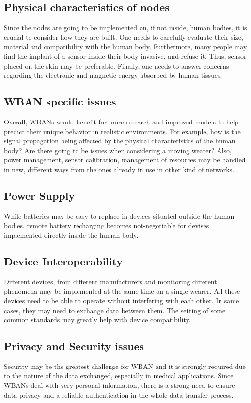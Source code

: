 \documentclass[conference]{IEEEtran}
\begin{document}
\subsection {Physical characteristics of nodes}
Since the nodes are going to be implemented on, if not inside, human bodies, it is crucial to consider how they are built. One needs to carefully evaluate their size, material and compatibility with the human body. Furthermore, many people may find the implant of a sensor inside their body invasive, and refuse it. Thus, sensor placed on the skin may be preferable. Finally, one needs to answer concerns regarding the electronic and magnetic energy absorbed by human tissues.

\subsection {WBAN specific issues}
Overall, WBANs would benefit for more research and improved models to help predict their unique behavior in realistic environments. For example, how is the signal propagation being affected by the physical characteristics of the human body? Are there going to be issues when considering a moving wearer? Also, power management, sensor calibration, management of resources may be handled in new, different ways from the ones already in use in other kind of networks.

\subsection {Power Supply}
While batteries may be easy to replace in devices situated outside the human bodies, remote battery recharging becomes not-negotiable for devises implemented directly inside the human body.

\subsection {Device Interoperability}
Different devices, from different manufacturers and monitoring different phenomena may be implemented at the same time on a single wearer. All these devices need to be able to operate without interfering with each other. In same cases, they may need to exchange data between them. The setting of some common standards may greatly help with device compatibility. 

\subsection {Privacy and Security issues}
Security may be the greatest challenge for WBAN and it is strongly required due to the nature of the data exchanged, especially in medical applications. Since WBANs deal with very personal information, there is a strong need to ensure data privacy and a reliable authentication in the whole data transfer process. 
\end{document}
